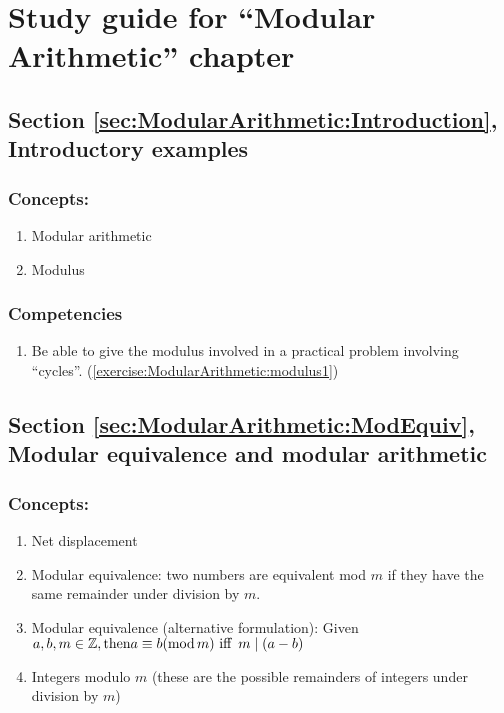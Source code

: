 \section{Study guide  for ``Modular Arithmetic''  chapter}
\label{sec:ModularArithmetic:StudyGuide} 


\subsection*{Section \ref{sec:ModularArithmetic:Introduction}, Introductory examples}
\subsubsection*{Concepts:}
\begin{enumerate}
\item 
Modular arithmetic
\item
Modulus
\end{enumerate}

\subsubsection*{Competencies}
\begin{enumerate}
\item
Be able to give the modulus involved in a practical problem involving ``cycles''. (\ref{exercise:ModularArithmetic:modulus1}) 
\end{enumerate}


\subsection*{Section \ref{sec:ModularArithmetic:ModEquiv}, Modular equivalence and modular arithmetic}
\subsubsection*{Concepts:}
\begin{enumerate}
\item 
Net displacement
\item 
Modular equivalence: two numbers are equivalent mod $m$ if they have the same remainder under division by $m$.
\item 
Modular equivalence (alternative formulation): Given $a, b, m \in \mathbb{Z}, \text{then}\\ a \equiv b(\text{mod}\, m) \mbox{ iff }\, m\mid(a-b)$
\item
Integers modulo $m$  (these are the possible remainders of integers under division by $m$)
\end{enumerate}

